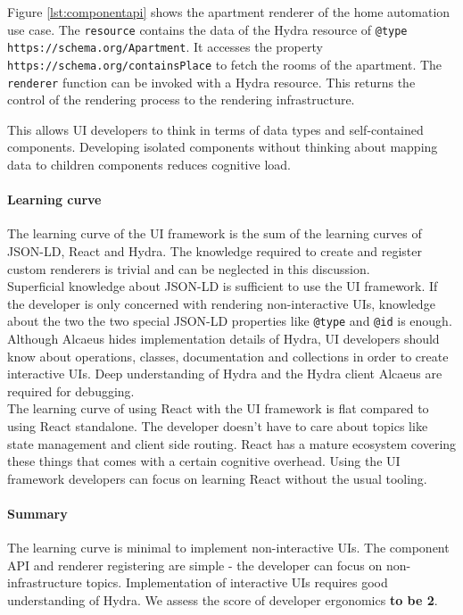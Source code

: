 Figure \ref{lst:componentapi} shows the apartment renderer of the home automation use case. The \lstinline{resource} contains the data of the Hydra resource of \lstinline{@type} \lstinline{https://schema.org/Apartment}. It accesses the property \lstinline{https://schema.org/containsPlace} to fetch the rooms of the apartment. The \lstinline{renderer} function can be invoked with a Hydra resource. This returns the control of the rendering process to the rendering infrastructure.

This allows UI developers to think in terms of data types and self-contained components. Developing isolated components without thinking about mapping data to children components reduces cognitive load.

\paragraph{Learning curve}
The learning curve of the UI framework is the sum of the learning curves of JSON-LD, React and Hydra. The knowledge required to create and register custom renderers is trivial and can be neglected in this discussion. \\
Superficial knowledge about JSON-LD is sufficient to use the UI framework. If the developer is only concerned with rendering non-interactive UIs, knowledge about the two the two special JSON-LD properties like \lstinline{@type} and \lstinline{@id} is enough. \\
Although Alcaeus hides implementation details of Hydra, UI developers should know about operations, classes, documentation and collections in order to create interactive UIs. Deep understanding of Hydra and the Hydra client Alcaeus are required for debugging. \\
The learning curve of using React with the UI framework is flat compared to using React standalone. The developer doesn't have to care about topics like state management and client side routing. React has a mature ecosystem covering these things that comes with a certain cognitive overhead. Using the UI framework developers can focus on learning React without the usual tooling.

\paragraph{Summary}
The learning curve is minimal to implement non-interactive UIs. The component API and renderer registering are simple - the developer can focus on non-infrastructure topics. Implementation of interactive UIs requires good understanding of Hydra. We assess the score of developer ergonomics \textbf{to be 2}.

